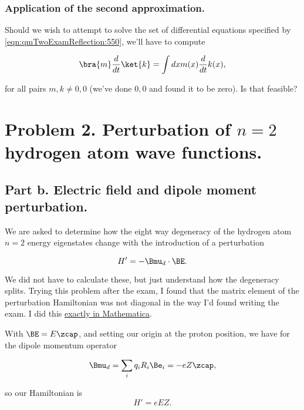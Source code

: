 \subsubsection{Application of the second approximation.}

Should we wish to attempt to solve the set of differential equations specified by \ref{eqn:qmTwoExamReflection:550}, we'll have to compute

\begin{equation}\label{eqn:qmTwoExamReflection:1090}
\bra{m} \frac{d}{dt} \ket{k} = \int dx m(x) \frac{d}{dt} k(x),
\end{equation}

for all pairs $m, k \ne 0, 0$ (we've done $0,0$ and found it to be zero).  Is that feasible?

\section{Problem 2.  Perturbation of $n=2$ hydrogen atom wave functions.}

\subsection{Part b.  Electric field and dipole moment perturbation.}

We are asked to determine how the eight way degeneracy of the hydrogen atom $n=2$ energy eigenstates change with the introduction of a perturbation

\begin{equation}\label{eqn:qmTwoExamReflection:570}
H' = -\Bmu_d \cdot \BE.
\end{equation}

We did not have to calculate these, but just understand how the degeneracy splits.  Trying this problem after the exam, I found that the matrix element of the perturbation Hamiltonian was not diagonal in the way I'd found writing the exam.  I did this \href{https://github.com/peeterjoot/physicsplay/blob/master/notes/phy456/qmTwoExamReflection.cdf}{exactly in Mathematica}.

With $\BE = E \zcap$, and setting our origin at the proton position, we have for the dipole momentum operator

\begin{equation}\label{eqn:qmTwoExamReflection:590}
\Bmu_d = \sum_i q_i R_i \Be_i = - e Z \zcap,
\end{equation}

so our Hamiltonian is
\begin{equation}\label{eqn:qmTwoExamReflection:610}
H' = e E Z.
\end{equation}

